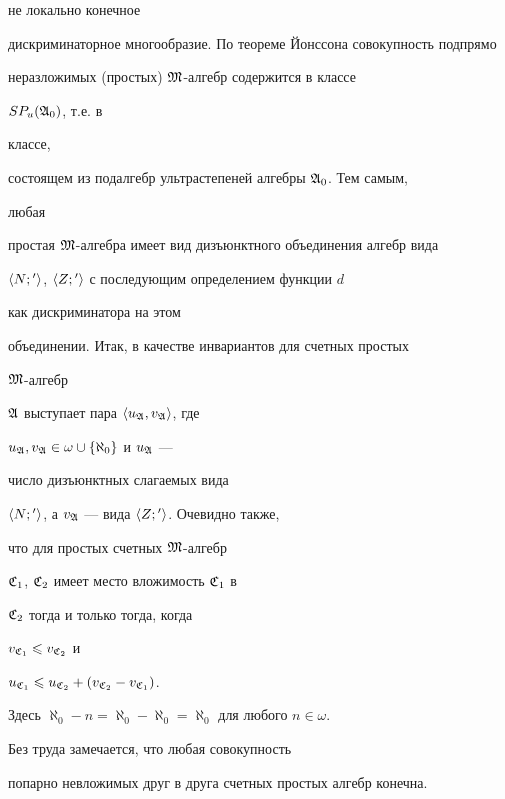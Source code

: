 не локально конечное


дискриминаторное многообразие. По теореме Йонссона совокупность подпрямо


неразложимых (простых) $\frak M$-алгебр содержится в классе


$SP_u(\frak A_0)$, т.е. в


классе,


состоящем из подалгебр ультрастепеней алгебры $\frak A_0$. Тем самым,


любая


простая $\frak M$-алгебра имеет вид дизъюнктного объединения алгебр вида


$\langle N;{}'\rangle$, $\langle Z;{}'\rangle$ с последующим определением функции $d$


как дискриминатора на этом


объединении. Итак, в качестве инвариантов для счетных простых


$\frak M$-алгебр


$\frak A$ выступает пара $\langle u_{\frak A},v_{\frak A}\rangle$, где


$u_{\frak A},v_{\frak A}\in\omega\cup\{\aleph_0\}$ и $u_{\frak A}$ ---


число дизъюнктных слагаемых вида


$\langle N;{}'\rangle$, а $v_{\frak A}$ --- вида $\langle Z;{}'\rangle$. Очевидно также,


что для простых счетных $\frak M$-алгебр


$\frak C_1$, $\frak C_2$ имеет место вложимость $\frak C_1$ в


$\frak C_2$ тогда и только тогда, когда


$v_{\frak C_1}\leqslant v_{\frak C_2}$ и


$u_{\frak C_1}\leqslant u_{\frak C_2}+(v_{\frak C_2}-v_{\frak C_1})$.


Здесь $\aleph_0-n=\aleph_0-\aleph_0=\aleph_0$ для любого $n\in\omega$.


Без труда замечается, что любая совокупность


попарно невложимых друг в друга счетных простых алгебр конечна.





